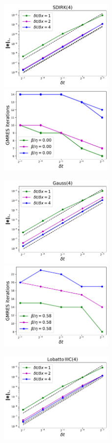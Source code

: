 \documentclass[review]{siamart}
\begin{document}
\begin{figure}[H]
\centerline{
\includegraphics[width = 0.5\textwidth]{figures/solver_convergence/SDIRK4_convergence}
\quad
\includegraphics[width = 0.5\textwidth]{figures/solver_convergence/SDIRK4_gmres}
}
\centerline{
\includegraphics[width = 0.5\textwidth]{figures/solver_convergence/Gauss4_convergence}
\quad
\includegraphics[width = 0.5\textwidth]{figures/solver_convergence/Gauss4_gmres}
}
\centerline{
\includegraphics[width = 0.5\textwidth]{figures/solver_convergence/Lobatto4_convergence}
}
\end{figure}
\end{document}
